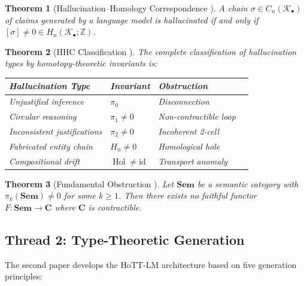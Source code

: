 \documentclass[11pt,a4paper]{article}
\theoremstyle{plain}
\newtheorem{theorem}{Theorem}[section]
\theoremstyle{definition}
\theoremstyle{remark}
\newcommand{\CC}{\mathbf{C}}
\newcommand{\Sem}{\mathbf{Sem}}
\newcommand{\id}{\mathrm{id}}
\DeclareMathOperator{\Hol}{Hol}
\begin{document}
\begin{theorem}[Hallucination--Homology Correspondence {\cite[Theorem~3.1]{long2026hhc}}]\label{thm:hhc-review}
A chain $\sigma \in C_n(\mathcal{K}_\bullet)$ of claims generated by a language model is hallucinated if and only if $[\sigma] \neq 0 \in H_n(\mathcal{K}_\bullet; \mathbb{Z})$.
\end{theorem}

\begin{theorem}[HHC Classification {\cite[Theorem~4.1]{long2026hhc}}]\label{thm:hhc-classification-review}
The complete classification of hallucination types by homotopy-theoretic invariants is:
\begin{center}
\begin{tabular}{llll}
\toprule
\textbf{Hallucination Type} & \textbf{Invariant} & \textbf{Obstruction} \\
\midrule
Unjustified inference & $\pi_0$ & Disconnection \\
Circular reasoning & $\pi_1 \neq 0$ & Non-contractible loop \\
Inconsistent justifications & $\pi_2 \neq 0$ & Incoherent 2-cell \\
Fabricated entity chain & $H_n \neq 0$ & Homological hole \\
Compositional drift & $\Hol \neq \id$ & Transport anomaly \\
\bottomrule
\end{tabular}
\end{center}
\end{theorem}

\begin{theorem}[Fundamental Obstruction {\cite[Theorem~5.1]{long2026hhc}}]\label{thm:obstruction-review}
Let $\Sem$ be a semantic category with $\pi_k(\Sem) \neq 0$ for some $k \geq 1$. Then there exists no faithful functor $F\colon \Sem \to \CC$ where $\CC$ is contractible.
\end{theorem}

\subsection{Thread 2: Type-Theoretic Generation}\label{sec:review-generation}

The second paper \cite{long2026homotopical} develops the HoTT-LM architecture based on five generation principles:
\end{document}
